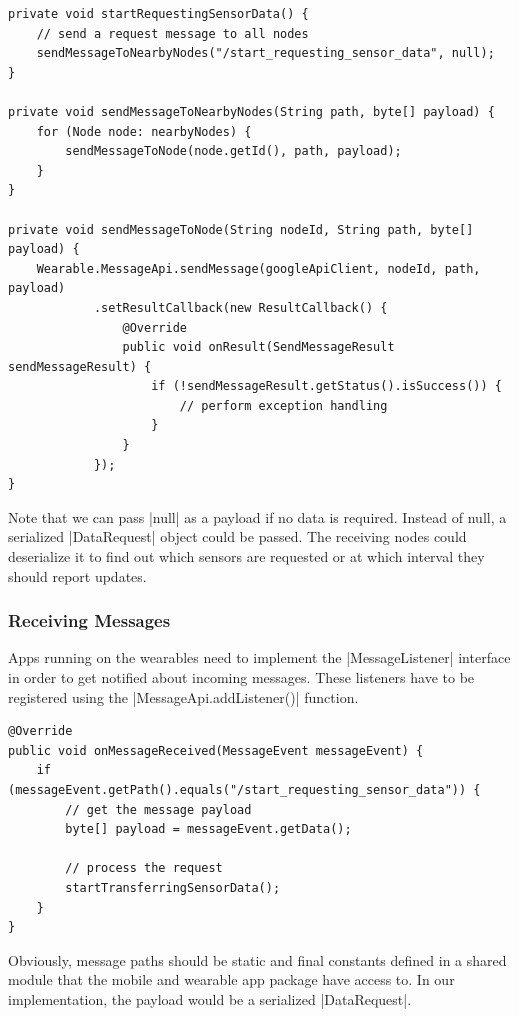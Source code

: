 \begin{lstlisting}[label=sendmessage]
private void startRequestingSensorData() {
	// send a request message to all nodes
	sendMessageToNearbyNodes("/start_requesting_sensor_data", null);
}

private void sendMessageToNearbyNodes(String path, byte[] payload) {
	for (Node node: nearbyNodes) {
		sendMessageToNode(node.getId(), path, payload);
	}
}

private void sendMessageToNode(String nodeId, String path, byte[] payload) {
	Wearable.MessageApi.sendMessage(googleApiClient, nodeId, path, payload)
			.setResultCallback(new ResultCallback() {
				@Override
				public void onResult(SendMessageResult sendMessageResult) {
					if (!sendMessageResult.getStatus().isSuccess()) {
						// perform exception handling
					}
				}
			});
}
\end{lstlisting}

Note that we can pass |null| as a payload if no data is required.
Instead of null, a serialized |DataRequest| object could be passed.
The receiving nodes could deserialize it to find out which sensors are requested or at which interval they should report updates.

\clearpage

\subsubsection{Receiving Messages}
\label{sec:implementation:transferringdata:receive}

Apps running on the wearables need to implement the |MessageListener|\cite{androiddocs:messagelistener} interface in order to get notified about incoming messages. These listeners have to be registered using the |MessageApi.addListener()| function.

\begin{lstlisting}[label=receivemessage]
@Override
public void onMessageReceived(MessageEvent messageEvent) {
    if (messageEvent.getPath().equals("/start_requesting_sensor_data")) {
        // get the message payload
        byte[] payload = messageEvent.getData();

        // process the request
        startTransferringSensorData();
    }
}
\end{lstlisting}

Obviously, message paths should be static and final constants defined in a shared module that the mobile and wearable app package have access to. In our implementation, the payload would be a serialized |DataRequest|.

\clearpage